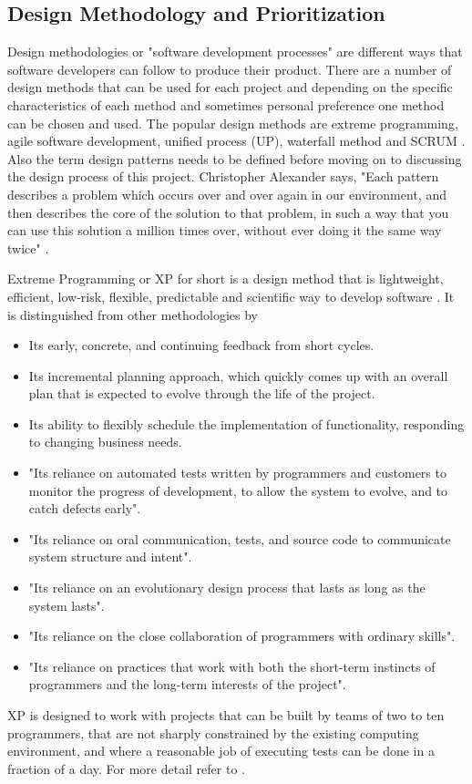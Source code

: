 \documentclass[10pt, a4paper, titlepage]{article}
\begin{document}
\subsection{Design Methodology and Prioritization}
Design methodologies or "software development processes" are different ways that software developers can follow to produce their product. There are a number of design methods that can be used for each project and depending on the specific characteristics of each method and sometimes personal preference one method can be chosen and used. The popular design methods are extreme programming, agile software development, unified process (UP), waterfall method and SCRUM \cite{Agile_book}.\\
Also the term design patterns needs to be defined before moving on to discussing the design process of this project. Christopher Alexander says, "Each pattern describes a problem which occurs over and over again in our environment, and then describes the core of the solution to that problem, in such a way that you can use this solution a million times over, without ever doing it the same way twice" \cite{Gof_book}. 

Extreme Programming or XP for short is a design method that is lightweight, efficient, low-risk, flexible, predictable and scientific way to develop software \cite{Kent_book}. It is distinguished from other methodologies by
\begin{itemize}
\item Its early, concrete, and continuing feedback from short cycles.
\item Its incremental planning approach, which quickly comes up with an overall plan that is expected to evolve through the life of the project.
\item Its ability to flexibly schedule the implementation of functionality, responding to changing business needs.
\item "Its reliance on automated tests written by programmers and customers to monitor the progress of development, to allow the system to evolve, and to catch defects early".
\item "Its reliance on oral communication, tests, and source code to communicate system structure and intent".
\item "Its reliance on an evolutionary design process that lasts as long as the system lasts".
\item "Its reliance on the close collaboration of programmers with ordinary skills".
\item "Its reliance on practices that work with both the short-term instincts of programmers and the long-term interests of the project".
\end{itemize}
XP is designed to work with projects that can be built by teams of two to ten programmers, that are not sharply constrained by the existing computing environment, and where a reasonable job of executing tests can be done in a fraction of a day. For more detail refer to \cite{Kent_book}.\\
\end{document}
